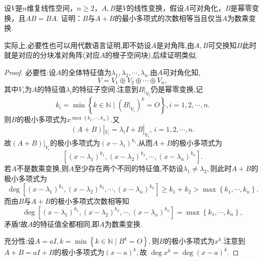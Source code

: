 \documentclass[../../main.tex]{subfiles}
\begin{document}
\begin{example}
设$V$是$n$维复线性空间，$n \geqslant 2$，$A,B$是$V$的线性变换，假设$A$可对角化，$B$是幂零变换，且$AB = BA$. 证明：$B$与$A + B$的最小多项式的次数相等当且仅当$A$为数乘变换.
\end{example}
\begin{note}
实际上,必要性也可以用代数语言证明,即不妨设$A$是对角阵,由$A,B$可交换知$B$此时就是对应的分块准对角阵(对应$A$的根子空间块),后续证明类似.
\end{note}
\begin{proof}
{\heiti 必要性:}设$A$的全体特征值为$\lambda_1,\lambda_2,\cdots,\lambda_n$.由$A$可对角化知,
$$V=V_1\oplus V_2\oplus \cdots \oplus V_n,$$
其中$V_i$为$A$的特征值$\lambda_i$的特征子空间.注意到$B|_{V_i}$仍是幂零变换,记
$$k_i=\min\left\{k\in\mathbb{N}\mid (B|_{V_i})^k=O\right\},i=1,2,\cdots,n.$$
则$B$的极小多项式为$x^{\max\left\{k_1,\cdots,k_n\right\}}.$又
$$(A+B)|_{V_i}=\lambda_i I+B|_{V_i},\,i=1,2,\cdots,n.$$
故$(A+B)|_{V_i}$的极小多项式为$(x-\lambda_i)^{k_i}.$从而$A+B$的极小多项式为
$$\left[(x-\lambda_1)^{k_1},(x-\lambda_2)^{k_2},\cdots,(x-\lambda_n)^{k_n}\right].$$
若$A$不是数乘变换,则$A$至少存在两个不同的特征值,不妨设$\lambda_1\neq \lambda_2,$则此时$A+B$的极小多项式为
$$\deg\left[(x-\lambda_1)^{k_1},(x-\lambda_2)^{k_2},\cdots,(x-\lambda_n)^{k_n}\right]\geqslant k_1+k_2>\max\left\{k_1,\cdots,k_n\right\}.$$
而由$B$与$A+B$的极小多项式次数相等知
$$\deg\left[(x-\lambda_1)^{k_1},(x-\lambda_2)^{k_2},\cdots,(x-\lambda_n)^{k_n}\right]=\max\left\{k_1,\cdots,k_n\right\},$$
矛盾!故$A$的特征值全都相同,即$A$为数乘变换.

{\heiti 充分性:}设$A=aI,k=\min\left\{k\in\mathbb{N}\mid B^k=O\right\},$则$B$的极小多项式为$x^k.$注意到$A+B=aI+B$的极小多项式为$(x-a)^k,$故
$\deg x^k=\deg(x-a)^k.$

\end{proof}
\end{document}
